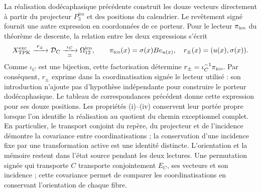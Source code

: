 La réalisation dodécaphasique précédente construit les douze vecteurs
directement à partir du projecteur \(P_3^{\mathrm{ico}}\) et des positions du calendrier.
Le revêtement signé fournit une autre expression en coordonnées de ce
porteur. Pour le lecteur \(\pi_{\rm ico}\) du théorème de descente,
la relation entre les deux expressions s'écrit
\begin{equation}
 X_{\rm TPK}^{\rm exc}\xrightarrow{\ r_\pm\ }
 \mathcal D_C\xrightarrow[\simeq]{\ \iota_C\ }
 \Omega_{12}^{\rm ico},\qquad
 \pi_{\rm ico}(x)=\sigma(x)Be_{u(x)},\quad
 r_\pm(x)=(u(x),\sigma(x)).
 \label{ii:ico:factorizacion-lector}
\end{equation}
Comme \(\iota_C\) est une bijection, cette factorisation détermine
\(r_\pm=\iota_C^{-1}\pi_{\rm ico}\). Par conséquent, \(r_\pm\) exprime
dans la coordinatisation signée le lecteur utilisé : son introduction
n’ajoute pas d’hypothèse indépendante pour construire le porteur
dodécaphasique. Le tableau de correspondances précédent donne cette expression
pour ses douze positions. Les propriétés (i)--(iv) conservent leur
portée propre lorsque l’on identifie la réalisation au quotient
du chemin exceptionnel complet. En particulier, le transport conjoint
du repère, du projecteur et de l’incidence démontre la covariance entre coordinatisations ;
la conservation d’une incidence fixe par une transformation active
est une identité distincte. L’orientation et la mémoire restent
dans l’état source pendant les deux lectures.
Une permutation signée qui transporte \(C\) transporte conjointement
\(E_C\), ses vecteurs et son incidence ; cette covariance permet de comparer
les coordinatisations en conservant l’orientation de chaque fibre.
